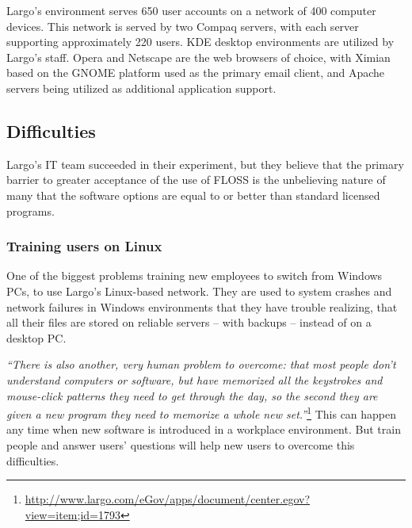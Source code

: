  Largo’s environment serves 650 user accounts on a network of 400 computer devices. This network is served by two Compaq servers, with each server supporting approximately 220 users. KDE desktop environments are utilized by Largo’s staff. Opera and Netscape are the web browsers of choice, with Ximian based on the GNOME platform used as the primary email client, and Apache servers being utilized as additional application support.
 
 \subsection{Difficulties}
  Largo’s IT team succeeded in their experiment, but they believe that the primary barrier to greater acceptance of the use of FLOSS is the unbelieving nature of many that the software options are equal to or better than standard licensed programs.

\subsubsection*{Training users on Linux}
One of the biggest problems training new employees to switch from Windows PCs, to use Largo's Linux-based network. 
They are used to system crashes and network failures in Windows environments that they have trouble realizing, that all their files are stored on reliable servers -- with backups -- instead of on a desktop PC.

\textit{``There is also another, very human problem to overcome: that most people don't understand computers or software, but have memorized all the keystrokes and mouse-click patterns they need to get through the day, so the second they are given a new program they need to memorize a whole new set.''}\footnote{\url{http://www.largo.com/eGov/apps/document/center.egov?view=item;id=1793}} This can happen any time when new software is introduced in a workplace environment. But train people and answer users' questions will help new users to overcome this difficulties.

